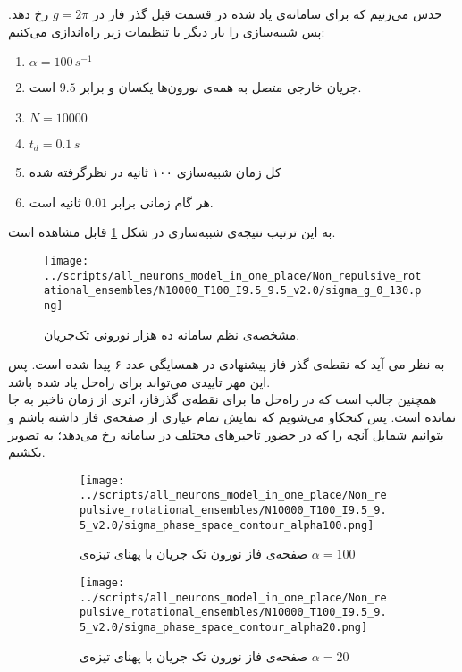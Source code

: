 حدس می‌زنیم که برای سامانه‌ی یاد شده در قسمت قبل گذر فاز در 
$g = 2\pi$
رخ دهد. پس شبیه‌سازی را بار دیگر با تنظیمات زیر راه‌اندازی می‌کنیم:

\begin{tcolorbox}[colback=green!5!white,colframe=green!75!black]
	\begin{enumerate}[*]
		\item
		$\alpha = 100\, s^{-1}$
		\item
		جریان خارجی متصل به همه‌ی نورون‌ها یکسان و برابر
		 $9.5$
		  است.
		\item
		$N = 10000$
		\item
		$t_d = 0.1\, s$ 
		\item 
		کل زمان شبیه‌سازی ۱۰۰ ثانیه در نظرگرفته شده
		\item 
		هر گام زمانی برابر $0.01$ ثانیه است.
	\end{enumerate}
\end{tcolorbox}
به این ترتیب نتیجه‌ی شبیه‌سازی در شکل 
\ref{fig:sigma_non_repulsive_single_input}
قابل مشاهده است.
\begin{figure}
	\centering
	\texttt{[image: ../scripts/all\_neurons\_model\_in\_one\_place/Non\_repulsive\_rotational\_ensembles/N10000\_T100\_I9.5\_9.5\_v2.0/sigma\_g\_0\_130.png]}
	\caption{مشخصه‌ی نظم سامانه ده هزار نورونی تک‌جریان.}
	\label{fig:sigma_non_repulsive_single_input}
\end{figure}
به نظر می آید که نقطه‌ی گذر فاز پیشنهادی در همسایگی عدد ۶ پیدا شده است. پس این مهر تاییدی می‌تواند برای راه‌حل یاد شده باشد.\\
همچنین جالب است که در راه‌حل ما برای نقطه‌ی گذرفاز، اثری از زمان تاخیر به جا نمانده است. پس کنجکاو می‌شویم که نمایش تمام عیاری از صفحه‌ی فاز داشته باشم و بتوانیم شمایل آنچه را که در حضور تاخیرهای مختلف در سامانه رخ می‌دهد؛ به تصویر بکشیم.

\begin{figure}[h]
	\begin{subfigure}[b]{0.5\textwidth}
		\centering
		\texttt{[image: ../scripts/all\_neurons\_model\_in\_one\_place/Non\_repulsive\_rotational\_ensembles/N10000\_T100\_I9.5\_9.5\_v2.0/sigma\_phase\_space\_contour\_alpha100.png]}
		\caption{صفحه‌ی فاز نورون تک جریان با پهنای تیزه‌ی 
				$\alpha = 100$}
		\label{fig:non_repulsive_single_input_sigma_phase_space_alpha100}
	\end{subfigure}
	\hfill
	\begin{subfigure}[b]{0.5\textwidth}
		\centering
		\texttt{[image: ../scripts/all\_neurons\_model\_in\_one\_place/Non\_repulsive\_rotational\_ensembles/N10000\_T100\_I9.5\_9.5\_v2.0/sigma\_phase\_space\_contour\_alpha20.png]}
		\caption{صفحه‌ی فاز نورون تک جریان با پهنای تیزه‌ی 
		$\alpha = 20$}
		\label{fig:non_repulsive_single_input_sigma_phase_space_alpha20}
	\end{subfigure}
	\caption{}
	\label{fig:non_repulsive_single_input_sigma_phase_space}
\end{figure}

